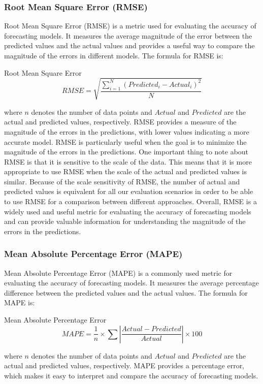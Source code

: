     \subsubsection{Root Mean Square Error (RMSE)}
    \label{sec:rmse-metrics-evaluation}

      Root Mean Square Error (RMSE) \cite{chaiRootMeanSquare2014} is a metric used for evaluating the accuracy of forecasting models. It measures the average magnitude of the error between the predicted values and the actual values and provides a useful way to compare the magnitude of the errors in different models.
      The formula for RMSE is:
      \begin{pabox}{Root Mean Square Error}
        $$RMSE = \sqrt{\frac{\sum_{i = 1}^{N}\left(Predicted_i - Actual_i\right)^2}{N}}$$
      \end{pabox}
      where $n$ denotes the number of data points and $Actual$ and $Predicted$ are the actual and predicted values, respectively.
      RMSE provides a measure of the magnitude of the errors in the predictions, with lower values indicating a more accurate model. 
      RMSE is particularly useful when the goal is to minimize the magnitude of the errors in the predictions.
      One important thing to note about RMSE is that it is sensitive to the scale of the data. This means that it is more appropriate to use RMSE when the scale of the actual and predicted values is similar.
      Because of the scale sensitivity of RMSE, the number of actual and predicted values is equivalent for all our evaluation scenarios in order to be able to use RMSE for a comparison between different approaches.
      Overall, RMSE is a widely used and useful metric for evaluating the accuracy of forecasting models and can provide valuable information for understanding the magnitude of the errors in the predictions.


    \subsubsection{Mean Absolute Percentage Error (MAPE)}
    \label{sec:mape-metrics-evaluation}

      Mean Absolute Percentage Error (MAPE) \cite{demyttenaereMeanAbsolutePercentage2016} is a commonly used metric for evaluating the accuracy of forecasting models. It measures the average percentage difference between the predicted values and the actual values.
      The formula for MAPE is:

      \begin{pabox}{Mean Absolute Percentage Error}
        $$MAPE = \frac{1}{n} \times \sum \left|\frac{Actual - Predicted}{Actual}\right| \times 100$$
      \end{pabox}
      where $n$ denotes the number of data points and $Actual$ and $Predicted$ are the actual and predicted values, respectively.
      MAPE provides a percentage error, which makes it easy to interpret and compare the accuracy of forecasting models. 
      
